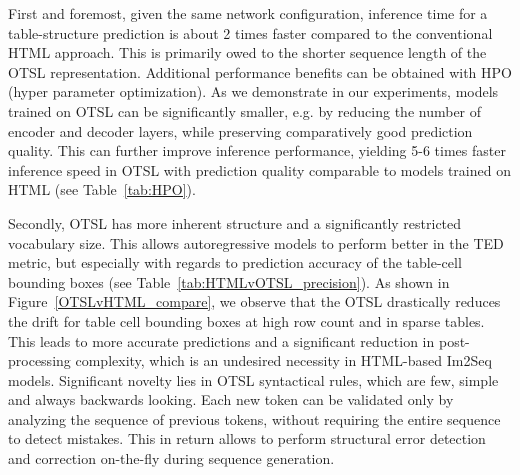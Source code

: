 \documentclass[runningheads]{llncs}
\begin{document}
First and foremost, given the same network configuration, inference time for a table-structure prediction is about 2 times faster compared to the conventional HTML approach. This is primarily owed to the shorter sequence length of the OTSL representation. Additional performance benefits can be obtained with HPO (hyper parameter optimization). As we demonstrate in our experiments, models trained on OTSL can be significantly smaller, e.g. by reducing the number of encoder and decoder layers, while preserving comparatively good prediction quality. This can further improve inference performance, yielding 5-6 times faster inference speed in OTSL with prediction quality comparable to models trained on HTML (see Table~\ref{tab:HPO}).

Secondly, OTSL has more inherent structure and a significantly restricted vocabulary size. This allows autoregressive models to perform better in the TED metric, but especially with regards to prediction accuracy of the table-cell bounding boxes (see Table~\ref{tab:HTMLvOTSL_precision}). As shown in Figure~\ref{OTSLvHTML_compare}, we observe that the OTSL drastically reduces the drift for table cell bounding boxes at high row count and in sparse tables. This leads to more accurate predictions and a significant reduction in post-processing complexity, which is an undesired necessity in HTML-based Im2Seq models.
Significant novelty lies in OTSL syntactical rules, which are few, simple and always backwards looking. Each new token can be validated only by analyzing the sequence of previous tokens, without requiring the entire sequence to detect mistakes. This in return allows to perform structural error detection and correction on-the-fly during sequence generation.



\end{document}
